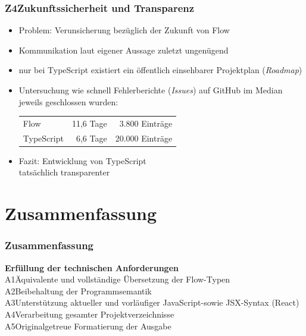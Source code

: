       \begin{frame}
        \frametitle{Z4\hspace{0.75em}Zukunftssicherheit und Transparenz}
        \begin{itemize}
          \item Problem: Verunsicherung bezüglich der Zukunft von Flow
          \item Kommunikation laut eigener Aussage zuletzt ungenügend~\autocite{FLOW:UPDATE_2019}
          \item nur bei TypeScript existiert ein öffentlich einsehbarer Projektplan (\textit{Roadmap})
          \item Untersuchung wie schnell Fehlerberichte (\textit{Issues}) auf GitHub im Median jeweils geschlossen wurden:\\
            \vspace{.5em}
            {
              \footnotesize
              \begin{tabu}{@{}lrr@{}}
                Flow & 11,6 Tage & 3.800 Einträge \\
                TypeScript & 6,6 Tage & 20.000 Einträge \\
              \end{tabu}
            }
          \item Fazit: Entwicklung von TypeScript\\tatsächlich transparenter
        \end{itemize}
      \end{frame}

  \section{Zusammenfassung}

    \begin{frame}
      \frametitle{Zusammenfassung}
      \textbf{Erfüllung der technischen Anforderungen}\\[1em]
      A1\hspace{0.75em}Äquivalente und vollständige Übersetzung der Flow-Typen\\[.6em]
      A2\hspace{0.75em}Beibehaltung der Programmsemantik\\[.6em]
      A3\hspace{0.75em}Unterstützung aktueller und vorläufiger JavaScript-\secframebr sowie JSX-Syntax (React)\\[.6em]
      A4\hspace{0.75em}Verarbeitung gesamter Projektverzeichnisse\\[.6em]
      A5\hspace{0.75em}Originalgetreue Formatierung der Ausgabe
    \end{frame}

